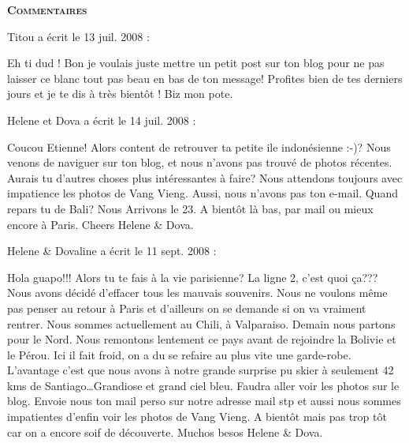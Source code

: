 \bigskip
\textbf{\textsc{Commentaires}}

\medskip
Titou a écrit le 13 juil. 2008 :
\begin{displayquote}
Eh ti dud !
Bon je voulais juste mettre un petit post sur ton blog pour ne pas laisser ce blanc tout pas beau en bas de ton message! Profites bien de tes derniers jours et je te dis à très bientôt !
Biz mon pote.
\end{displayquote}

\medskip
Helene et Dova a écrit le 14 juil. 2008 :
\begin{displayquote}
Coucou Etienne!
Alors content de retrouver ta petite ile indonésienne :-)?
Nous venons de naviguer sur ton blog, et nous n'avons pas trouvé de photos récentes. Aurais tu d'autres choses plus intéressantes à faire?
Nous attendons toujours avec impatience les photos de Vang Vieng.
Aussi, nous n'avons pas ton e-mail.
Quand repars tu de Bali? Nous Arrivons le 23.
A bientôt là bas, par mail ou mieux encore à Paris.
Cheers Helene \& Dova.
\end{displayquote}

\medskip
Helene \& Dovaline a écrit le 11 sept. 2008 :
\begin{displayquote}
Hola guapo!!!
Alors tu te fais à la vie parisienne? La ligne 2, c'est quoi ça??? Nous avons décidé d'effacer tous les mauvais souvenirs. Nous ne voulons même pas penser au retour à Paris et d'ailleurs on se demande si on va vraiment rentrer.
Nous sommes actuellement au Chili, à Valparaiso. Demain nous partons pour le Nord. Nous remontons lentement ce pays avant de rejoindre la Bolivie et le Pérou. Ici il fait froid, on a du se refaire au plus vite une garde-robe. L'avantage c'est que nous avons à notre grande surprise pu skier à seulement 42 kms de Santiago\dots Grandiose et grand ciel bleu. Faudra aller voir les photos sur le blog.
Envoie nous ton mail perso sur notre adresse mail stp et aussi nous sommes impatientes d'enfin voir les photos de Vang Vieng.
A bientôt mais pas trop tôt car on a encore soif de découverte.
Muchos besos
Helene \& Dova.
\end{displayquote}

\vfill
